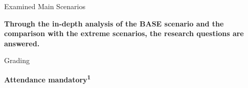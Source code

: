 \documentclass[aspectratio=169]{beamer}
\begin{document}
\begin{frame}{Examined Main Scenarios}
    \vspace{0.2cm}
    \begin{coloredblock}[grey]
        \centering
        \footnotesize\textbf{Through the in-depth analysis of the BASE scenario and the comparison with the extreme scenarios, the research questions are answered.}
    \end{coloredblock}

\end{frame}


\begin{frame}{Grading}

    \begin{coloredblock}[turquoise]
        \centering\footnotesize\textbf{Attendance mandatory\textsuperscript{1}}
    \end{coloredblock}


\end{frame}
\end{document}
